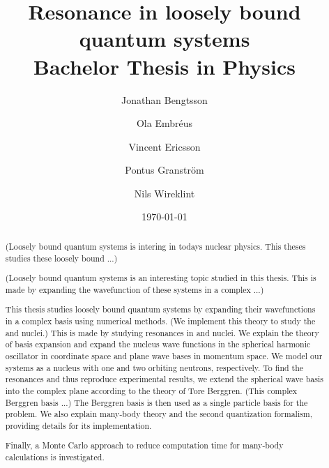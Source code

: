 \documentclass[12pt,a4paper]{report}
\begin{document}
  

\listoftodos

\title{Resonance in loosely bound quantum systems\\ 
\Large Bachelor Thesis in Physics}
\author{Jonathan Bengtsson \and Ola Embréus \and Vincent Ericsson \and Pontus Granström \and Nils Wireklint}
\date{\today}
\maketitle


\begin{abstract}
(Loosely bound quantum systems is intering in todays nuclear physics. This theses studies these loosely bound ...)

(Loosely bound quantum systems is an interesting topic studied in this thesis. This is made by expanding the wavefunction of these systems in a complex ...)

This thesis studies loosely bound quantum systems by expanding their wavefunctions in a complex basis using numerical methods. 
(We implement this theory to study the  and  nuclei.)
This is made by studying
resonances in  and  nuclei. We explain the theory of basis
expansion and expand the  nucleus wave functions in the spherical harmonic oscillator in coordinate space
and plane wave bases in momentum space. We model our systems as a  nucleus with one and two orbiting neutrons, respectively.
To find the resonances and thus reproduce experimental results, we extend the spherical wave basis into the complex plane according to the 
theory of Tore Berggren. 
(This complex Berggren basis ...) The Berggren basis is then used as a single particle
basis for the  problem. 
We also explain many-body theory and the second quantization formalism, providing details for its implementation.

Finally, a Monte Carlo approach to reduce computation time for many-body calculations is investigated.

\end{abstract}
\end{document}
